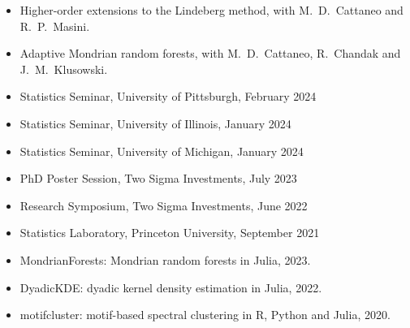 \documentclass{wgu-cv}
\begin{document}
\pagebreak

\begin{itemize}

  \item Higher-order extensions to the Lindeberg method,
    with M.\ D.\ Cattaneo and R.\ P.\ Masini.

  \item Adaptive Mondrian random forests,
    with M.\ D.\ Cattaneo, R.\ Chandak and J.\ M.\ Klusowski.
\end{itemize}

\begin{itemize}

  \item Statistics Seminar, University of Pittsburgh, February 2024
  \item Statistics Seminar, University of Illinois, January 2024
  \item Statistics Seminar, University of Michigan, January 2024
  \item PhD Poster Session, Two Sigma Investments, July 2023
  \item Research Symposium, Two Sigma Investments, June 2022
  \item Statistics Laboratory, Princeton University, September 2021
\end{itemize}

\begin{itemize}

  \item MondrianForests: Mondrian random forests in Julia, 2023. \\

  \item DyadicKDE: dyadic kernel density estimation in Julia, 2022. \\

  \item motifcluster: motif-based spectral clustering
    in R, Python and Julia, 2020. \\

\end{itemize}

\vspace{-0.22cm}
\end{document}
